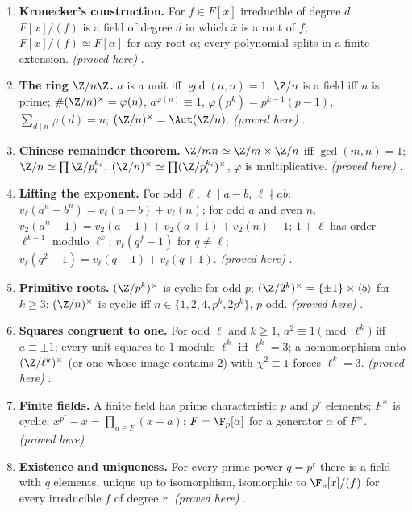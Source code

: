 \begin{enumerate}[label=\textbf{\thechapter.\arabic*}]
\item \textbf{Kronecker's construction.} For $f\in F[x]$ irreducible of degree $d$, $F[x]/(f)$ is a field of degree $d$ in which $\bar x$
is a root of $f$; $F[x]/(f)\simeq F[\alpha]$ for any root $\alpha$; every polynomial splits in a finite extension. \emph{(proved here)}
.
\item \textbf{The ring $\Z/n\Z$.} $a$ is a unit iff $\gcd(a,n)=1$; $\Z/n$ is a field iff $n$ is prime; $\#(\Z/n)^\times=\varphi(n)$,
$a^{\varphi(n)}\equiv1$, $\varphi(p^k)=p^{k-1}(p-1)$, $\sum_{d\mid n}\varphi(d)=n$; $(\Z/n)^\times=\Aut(\Z/n)$. \emph{(proved here)} .
\item \textbf{Chinese remainder theorem.} $\Z/mn\simeq\Z/m\times\Z/n$ iff $\gcd(m,n)=1$; $\Z/n\simeq\prod\Z/p_i^{k_i}$,
$(\Z/n)^\times\simeq\prod(\Z/p_i^{k_i})^\times$, $\varphi$ is multiplicative. \emph{(proved here)} .
\item \textbf{Lifting the exponent.} For odd $\ell$, $\ell\mid a-b$, $\ell\nmid ab$: $v_\ell(a^n-b^n)=v_\ell(a-b)+v_\ell(n)$; for odd $a$ and even
$n$, $v_2(a^n-1)=v_2(a-1)+v_2(a+1)+v_2(n)-1$; $1+\ell$ has order $\ell^{k-1}$ modulo $\ell^k$; $v_\ell(q^f-1)$ for $q\ne\ell$;
$v_\ell(q^2-1)=v_\ell(q-1)+v_\ell(q+1)$. \emph{(proved here)} .
\item \textbf{Primitive roots.} $(\Z/p^k)^\times$ is cyclic for odd $p$; $(\Z/2^k)^\times=\{\pm1\}\times\langle5\rangle$ for $k\ge3$;
$(\Z/n)^\times$ is cyclic iff $n\in\{1,2,4,p^k,2p^k\}$, $p$ odd. \emph{(proved here)} .
\item \textbf{Squares congruent to one.} For odd $\ell$ and $k\ge1$, $a^2\equiv1\pmod{\ell^k}$ iff $a\equiv\pm1$; every unit squares to $1$ modulo $\ell^k$
iff $\ell^k=3$; a homomorphism onto $(\Z/\ell^k)^\times$ (or one whose image contains $2$) with $\chi^2\equiv1$ forces
$\ell^k=3$. \emph{(proved here)} .
\item \textbf{Finite fields.} A finite field has prime characteristic $p$ and $p^r$ elements; $F^\times$ is cyclic;
$x^{p^r}-x=\prod_{a\in F}(x-a)$; $F=\F_p[\alpha]$ for a generator $\alpha$ of $F^\times$. \emph{(proved here)}
.
\item \textbf{Existence and uniqueness.} For every prime power $q=p^r$ there is a field with $q$ elements, unique up to
isomorphism, isomorphic to $\F_p[x]/(f)$ for every irreducible $f$ of degree $r$. \emph{(proved here)}
.

\end{enumerate}
